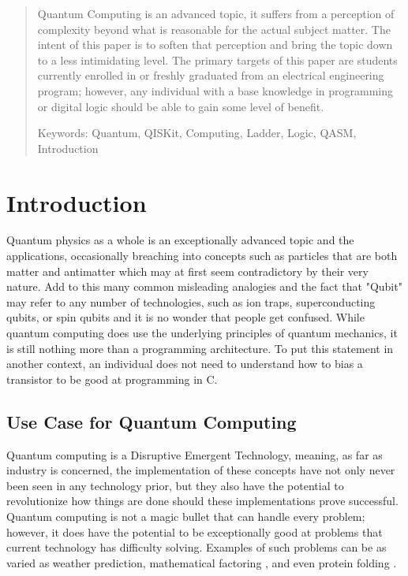 \documentclass[a4paper]{article}
\newcommand{\tabhere}{} %
\begin{document}
	\begin{abstract}
		
		Quantum Computing is an advanced topic, it suffers from a perception of complexity beyond what is reasonable for the actual subject matter.  The intent of this paper is to soften that perception and bring the topic down to a less intimidating level.  The primary targets of this paper are students currently enrolled in or freshly graduated from an electrical engineering program; however, any individual with a base knowledge in programming or digital logic should be able to gain some level of benefit. 
		
		Keywords:  Quantum, QISKit, Computing, Ladder, Logic, QASM, Introduction
	\end{abstract}
\newpage
\tableofcontents
\newpage 

\section{Introduction}
\label{sec:introduction} %
\tabhere Quantum physics as a whole is an exceptionally advanced topic and the applications, occasionally breaching into concepts such as particles that are both matter and antimatter\cite{mindBoggle} which may at first seem contradictory by their very nature.  Add to this many common misleading analogies and the fact that "Qubit" may refer to any number of technologies, such as ion traps, superconducting qubits, or spin qubits and it is no wonder that people get confused.  While quantum computing does use the underlying principles of quantum mechanics, it is still nothing more than a programming architecture.  To put this statement in another context, an individual does not need to understand how to bias a transistor to be good at programming in C.

\subsection{Use Case for Quantum Computing}%
\tabhere Quantum computing is a Disruptive Emergent Technology, meaning, as far as industry is concerned, the implementation of these concepts have not only never been seen in any technology prior, but they also have the potential to revolutionize how things are done should these implementations prove successful.  Quantum computing is not a magic bullet that can handle every problem; however, it does have the potential to be exceptionally good at problems that current technology has difficulty solving.  Examples of such problems can be as varied as weather prediction, mathematical factoring \cite{shorsAlgorithm}, and even protein folding \cite{dwavepfold}. 
\end{document}
